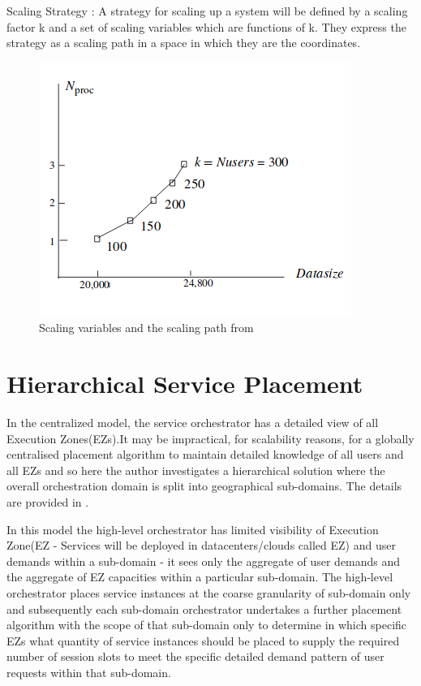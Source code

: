 Scaling Strategy : A strategy for scaling up a system will be defined by a scaling factor k and a set of scaling variables which are functions of k. They express the strategy as a scaling path in a space in which they are the coordinates.

\begin{figure}[h]
	\centering
	\includegraphics[width=0.7\linewidth]{figures/scalegraph}
	\caption{Scaling variables and the scaling path from \cite{jogalekar_evaluating_2000}}
	\label{fig:scalegraph}
\end{figure}

\newpage

\section{Hierarchical Service Placement}
In the centralized model, the service orchestrator has a detailed view of all Execution Zones(EZs).It may be impractical, for scalability reasons, for a globally centralised placement algorithm to maintain detailed knowledge of all users and all EZs and so here the author investigates a hierarchical solution where the overall orchestration domain is split into geographical sub-domains. The details are provided in .

In this model the high-level orchestrator has limited visibility of Execution Zone(EZ - Services will be deployed in datacenters/clouds called EZ) and user demands within a sub-domain - it sees only the aggregate of user demands and the aggregate of EZ capacities within a particular sub-domain. The high-level orchestrator places service instances at the coarse granularity of sub-domain only and subsequently each sub-domain orchestrator undertakes a further placement algorithm with the scope of that sub-domain only to determine in which specific EZs what quantity of service instances should be placed to supply the required number of session slots to meet the specific detailed demand pattern of user requests within that sub-domain.
